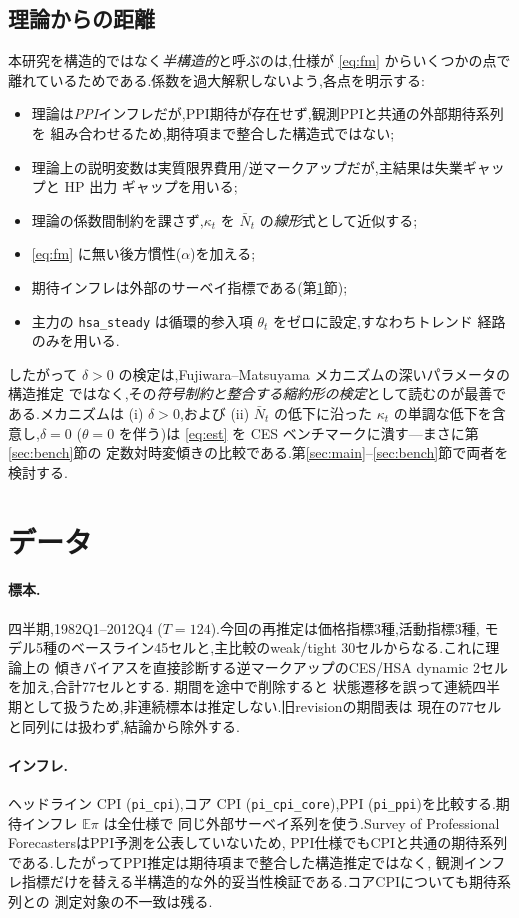 \documentclass[11pt]{article}
\newcommand{\code}[1]{\texttt{#1}}
\newcommand{\kt}{\kappa_t}
\begin{document}
\subsection{理論からの距離}
\label{sec:distance}
本研究を構造的ではなく\emph{半構造的}と呼ぶのは,仕様が \eqref{eq:fm} からいくつかの点で
離れているためである.係数を過大解釈しないよう,各点を明示する:
\begin{itemize}
\item 理論は\emph{PPI}インフレだが,PPI期待が存在せず,観測PPIと共通の外部期待系列を
組み合わせるため,期待項まで整合した構造式ではない;
\item 理論上の説明変数は実質限界費用/逆マークアップだが,主結果は失業ギャップと HP 出力
ギャップを用いる;
\item 理論の係数間制約を課さず,$\kt$ を $\bar N_t$ の\emph{線形}式として近似する;
\item \eqref{eq:fm} に無い後方慣性($\alpha$)を加える;
\item 期待インフレは外部のサーベイ指標である(第\ref{sec:data}節);
\item 主力の \code{hsa\_steady} は循環的参入項 $\theta_t$ をゼロに設定,すなわちトレンド
経路のみを用いる.
\end{itemize}
したがって $\delta>0$ の検定は,Fujiwara--Matsuyama メカニズムの深いパラメータの構造推定
ではなく,その\emph{符号制約と整合する縮約形の検定}として読むのが最善である.メカニズムは
(i) $\delta>0$,および (ii) $\bar N_t$ の低下に沿った $\kt$ の単調な低下を含意し,$\delta=0$
($\theta=0$ を伴う)は \eqref{eq:est} を CES ベンチマークに潰す---まさに第\ref{sec:bench}節の
定数対時変傾きの比較である.第\ref{sec:main}--\ref{sec:bench}節で両者を検討する.

\section{データ}
\label{sec:data}
\paragraph{標本.} 四半期,1982Q1--2012Q4 ($T=124$).今回の再推定は価格指標3種,活動指標3種,
モデル5種のベースライン45セルと,主比較のweak/tight 30セルからなる.これに理論上の
傾きバイアスを直接診断する逆マークアップのCES/HSA dynamic 2セルを加え,合計77セルとする.
期間を途中で削除すると
状態遷移を誤って連続四半期として扱うため,非連続標本は推定しない.旧revisionの期間表は
現在の77セルと同列には扱わず,結論から除外する.

\paragraph{インフレ.} ヘッドライン CPI (\code{pi\_cpi}),コア CPI
(\code{pi\_cpi\_core}),PPI (\code{pi\_ppi})を比較する.期待インフレ $\mathbb{E}\pi$ は全仕様で
同じ外部サーベイ系列を使う.Survey of Professional ForecastersはPPI予測を公表していないため,
PPI仕様でもCPIと共通の期待系列である.したがってPPI推定は期待項まで整合した構造推定ではなく,
観測インフレ指標だけを替える半構造的な外的妥当性検証である.コアCPIについても期待系列との
測定対象の不一致は残る.
\end{document}
